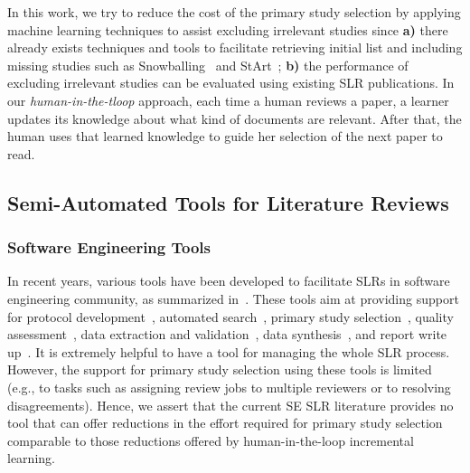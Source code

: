 \documentclass{svjour3}
\theoremstyle{break}
\begin{document}
In this work, we try to reduce the cost of the primary study selection by applying machine learning techniques to assist excluding irrelevant studies since \textbf{a)} there already exists techniques and tools to facilitate retrieving initial list and including missing studies such as Snowballing~\cite{jalali2012systematic} and StArt~\cite{hernandes2012using}; \textbf{b)} the performance of excluding irrelevant studies can be evaluated using existing SLR publications. In our {\em human-in-the-tloop} approach, each time a human reviews a paper, a learner updates its knowledge about what kind of documents are relevant. After that, the human uses that learned knowledge to guide her selection of the next paper to read.



\subsection{Semi-Automated Tools for Literature  Reviews}

\subsubsection{Software Engineering Tools}

In recent years, various tools have been developed to facilitate SLRs in software engineering community, as summarized in~\cite{marshall2015tools,marshall2014tools,marshall2013tools}. These tools aim at providing support for protocol development~\cite{Molleri:2015:SWA:2745802.2745825,fernandez2010slr,hernandes2012using}, automated search~\cite{Molleri:2015:SWA:2745802.2745825,hernandes2012using}, primary study selection~\cite{Molleri:2015:SWA:2745802.2745825,hernandes2012using,fernandez2010slr,bowes2012slurp}, quality assessment~\cite{fernandez2010slr,bowes2012slurp,Molleri:2015:SWA:2745802.2745825}, data extraction and validation~\cite{Molleri:2015:SWA:2745802.2745825,hernandes2012using,fernandez2010slr,bowes2012slurp}, data synthesis~\cite{Molleri:2015:SWA:2745802.2745825,hernandes2012using,fernandez2010slr,bowes2012slurp},
and report write up~\cite{Molleri:2015:SWA:2745802.2745825,hernandes2012using,fernandez2010slr,bowes2012slurp}. It is extremely helpful to have a tool for managing the whole SLR process. However, the support for primary study selection using these tools is limited (e.g., to tasks such as assigning review jobs to multiple reviewers or to resolving disagreements).
Hence, we assert that the current SE SLR literature provides
no tool that can offer reductions in the effort required for primary study selection comparable to those reductions offered by human-in-the-loop incremental learning. 
\end{document}

